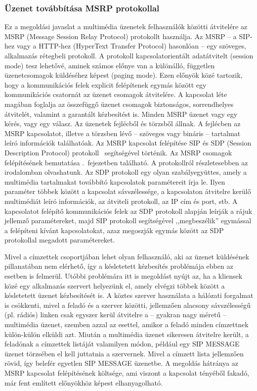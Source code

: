 \subsubsection{Üzenet továbbítása MSRP protokollal}
\label{sec:msrp_message}

Ez a megoldási javaslat a multimédia üzenetek felhasználók közötti átvitelére az MSRP (Message Session Relay Protocol) protokollt használja. Az MSRP -- a SIP-hez vagy a HTTP-hez (HyperText Transfer Protocol) hasonlóan -- egy szöveges, alkalmazás rétegbeli protokoll. A protokoll kapcsolatorientált adatátvitelt (session mode) tesz lehetővé, aminek számos előnye van a különálló, független üzenetcsomagok küldéséhez képest (paging mode).
Ezen előnyök közé tartozik, hogy a kommunikációs felek explicit felépítenek egymás között egy kommunikációs csatornát az üzenet csomagok átvitelére. A kapcsolat léte magában foglalja az összefüggő üzenet csomagok biztonságos, sorrendhelyes átvitelét, valamint a garantált kézbesítést is. Minden MSRP üzenet vagy egy kérés, vagy egy válasz. Az üzenetek fejlécből és törzsből állnak. A fejlécben az MSRP kapcsolatot, illetve a törzsben lévő -- szöveges vagy bináris -- tartalmat leíró információk találhatóak. Az MSRP kapcsolat felépítése SIP és SDP (Session Description Protocol) protokoll~\cite{rfc4566} segítségével történik. Az MSRP csomagok felépítésének bemutatása .~fejezetben található. A protokollról részletesebben az~\cite{rfc4975} irodalomban olvashatunk. Az SDP protokoll egy olyan szabályegyüttes, amely a multimédia tartalmakat továbbító kapcsolatok paramétereit írja le. Ilyen paraméter többek között a kapcsolat sávszélessége, a kapcsolaton átvitelre kerülő multimédiát leíró információk, az átviteli protokoll, az IP cím és port, stb. A kapcsolatot felépítő kommunikációs felek az SDP protokoll alapján leírják a rájuk jellemző paramétereket, majd SIP protokoll segítségével ,,megbeszélik'' egymással a felépíteni kívánt kapcsolatokat, azaz megoszják egymás között az SDP protokollal megadott paramétereket. 

Mivel a címzettek csoportjában lehet olyan felhasználó, aki az üzenet küldésének pillanatában nem elérhető, így a késletetett kézbesítés problémája ebben az esetben is felmerül. Utóbbi problémára itt is megoldást nyújt az, ha a kliensek közé egy alkalmazás szervert helyezünk el, amely elvégzi többek között a késletetett üzenet kézbesítését is. A köztes szerver használata a hálózati forgalmat is csökkenti, mivel a feladó és a szerver közötti, jellemzően alacsony sávszélességű (pl. rádiós) linken csak egyszer kerül átvitelre a -- gyakran nagy méretű -- multimédia üzenet, szemben azzal az esettel, amikor a feladó minden címzettnek külön-külön elküldi azt. Miután a multimédia üzenet sikeresen átvitelre került, a feladónak a címzettek listáját valamilyen módon, például egy SIP MESSAGE üzenet törzsében el kell juttatnia a szervernek. Mivel a címzett lista jellemzően rövid, így belefér egyetlen SIP MESSAGE üzenetbe. A megoldás hátránya az MSRP kapcsolat felépítésének költsége, ami viszont a kapcsolat tényéből fakadó, már fent említett előnyökhöz képest elhanyagolható.

